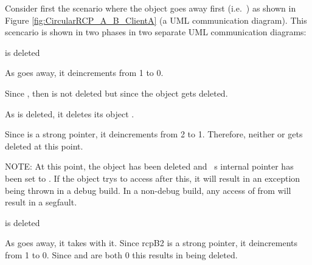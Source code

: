 \documentclass[pdf,ps2pdf,11pt]{SANDreport}
\begin{document}
Consider first the scenario where the {} object goes
away first (i.e.\ {}) as shown in
Figure {}\ref{fig:CircularRCP_A_B_ClientA} (a UML communication
diagram).  This scencario is shown in two phases in two separate UML
communication diagrams:

\begin{description}

{}\item[a)] {} is deleted

  \begin{description}

  {}\item[a.1)] As {} goes away, it deincrements
  {} from 1 to 0.

  {}\item[a.2)] Since {}, then
  {} is not deleted but since
  {} the object {} gets
  deleted.

  {}\item[a.3)] As {} is deleted, it deletes its
  {} object {}.

  {}\item[a.4)] Since {} is a strong pointer, it
  deincrements {} from 2 to 1.  Therefore,
  neither {} or {} gets deleted at this point.

  NOTE: At this point, the object {} has been deleted and
  {}~s internal pointer has been set to {}.
  If the {} object trys to access {} after this,
  it will result in an exception being thrown in a debug build.  In a
  non-debug build, any access of {} from {} will
  result in a segfault.

  \end{description}

{}\item[b)] {} is deleted

  \begin{description}

  {}\item[b.1)] As {} goes away, it takes
  {} with it.  Since rcpB2 is a strong pointer, it
  deincrements {} from 1 to 0.  Since
  {} and {} are
  both 0 this results in {} being deleted.


\end{description}
\end{description}
\end{document}
